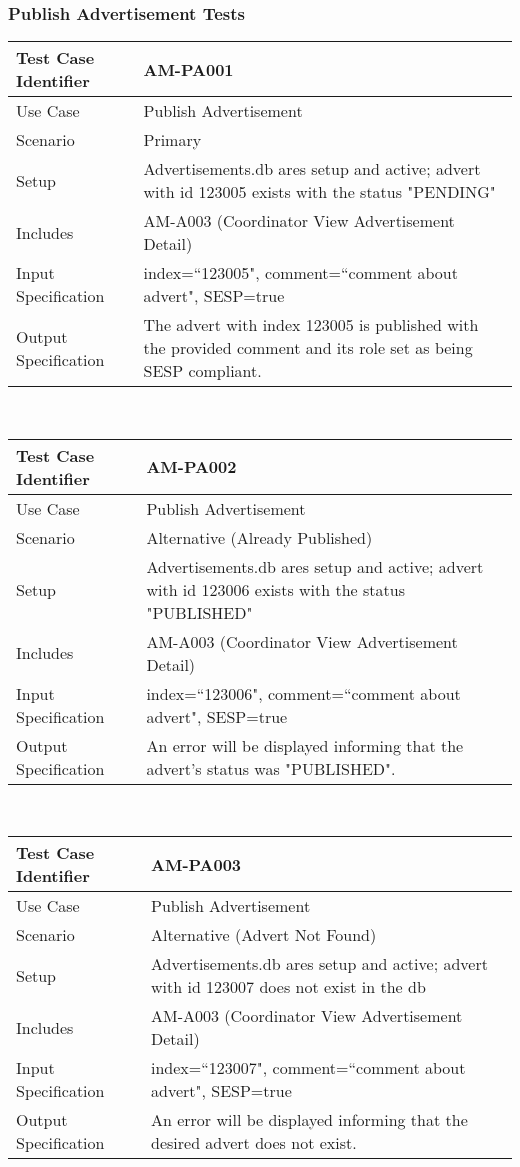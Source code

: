 \documentclass{l3deliverable}
\begin{document}
\subsubsection{Publish Advertisement Tests}
\begin{tabular}{lp{10cm}}
\hline 
\textbf{Test Case Identifier} & AM-PA001\tabularnewline
\hline 
\hline 
Use Case & Publish Advertisement \tabularnewline
\hline 
Scenario & Primary \tabularnewline
\hline 
Setup & Advertisements.db ares setup and active; advert with id 123005 exists with the status "PENDING"\tabularnewline
\hline 
Includes & AM-A003 (Coordinator View Advertisement Detail)\tabularnewline
\hline 
Input Specification & index=``123005", comment=``comment about advert", SESP=true \tabularnewline
\hline 
Output Specification &The advert with index 123005 is published with the provided comment and its role set as being SESP compliant.\tabularnewline
\hline 
\end{tabular}\\

\begin{tabular}{lp{10cm}}
\hline 
\textbf{Test Case Identifier} & AM-PA002\tabularnewline
\hline 
\hline 
Use Case & Publish Advertisement \tabularnewline
\hline 
Scenario & Alternative (Already Published) \tabularnewline
\hline 
Setup & Advertisements.db ares setup and active; advert with id 123006 exists with the status "PUBLISHED"\tabularnewline
\hline 
Includes & AM-A003 (Coordinator View Advertisement Detail)\tabularnewline
\hline 
Input Specification & index=``123006", comment=``comment about advert", SESP=true \tabularnewline
\hline 
Output Specification & An error will be displayed informing that the advert's status was "PUBLISHED".\tabularnewline
\hline 
\end{tabular}\\


\begin{tabular}{lp{10cm}}
\hline 
\textbf{Test Case Identifier} & AM-PA003\tabularnewline
\hline 
\hline 
Use Case & Publish Advertisement \tabularnewline
\hline 
Scenario & Alternative (Advert Not Found) \tabularnewline
\hline 
Setup & Advertisements.db ares setup and active; advert with id 123007 does not exist in the db\tabularnewline
\hline 
Includes & AM-A003 (Coordinator View Advertisement Detail)\tabularnewline
\hline 
Input Specification & index=``123007", comment=``comment about advert", SESP=true \tabularnewline
\hline 
Output Specification & An error will be displayed informing that the desired advert does not exist.\tabularnewline
\hline 
\end{tabular}\\
\end{document}
